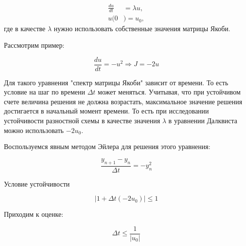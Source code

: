 \documentclass[10pt,a4paper]{article}
\begin{document}
	\begin{align}
		\frac{du}{dt} &= \lambda u,\\
		u(0&)=u_0,
	\end{align}
	 где в качестве $\lambda$ нужно использовать собственные значения матрицы 
	 Якоби.
	
	Рассмотрим пример:
	
	\begin{equation}
		\frac{du}{dt} = -u^{2} \Rightarrow J = -2u
	\end{equation}
	
	Для такого уравнения "спектр матрицы Якоби" зависит от времени. То есть 
	условие на шаг по времени $\Delta t$ может меняться. Учитывая, что при 
	устойчивом счете величина решения не должна возрастать, максимальное 
	значение решения достигается в начальный момент времени. То есть при 
	исследовании устойчивости разностной схемы в качестве значения $\lambda$ в 
	уравнении Далквиста можно использовать $-2 u_0$.  
	
	Воспользуемся явным методом Эйлера для решения этого уравнения:
	
	\begin{equation}
		\frac{y_{n + 1} - y_{n}}{\Delta t} = -y_{n}^{2}
	\end{equation}
	
	Условие устойчивости
	
	\begin{equation}
		\left|1 + \Delta t\left(-2u_0\right)\right| \leqslant 1
	\end{equation}
	
	Приходим к оценке:
	
	\begin{equation}
		\Delta t\leqslant 
		\frac{1}{\left|u_{0}\right|}
	\end{equation}
\end{document}
